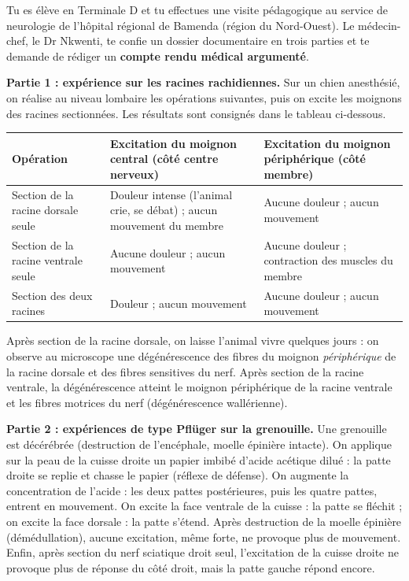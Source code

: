 \documentclass[11pt]{article}
\newcounter{popsec}
\newcounter{popsub}
\newcommand{\courssub}[1]{%
  \stepcounter{popsub}%
  \par\vspace{9pt}\noindent{\popxbold\fontsize{11.5}{13}\selectfont\color{popink}{\color{poporange}\thepopsec.\thepopsub}\hspace{6pt}#1}\par\nopagebreak\vspace{4pt}
}
\begin{document}
\courssub{Situation}

Tu es élève en Terminale D et tu effectues une visite pédagogique au service de neurologie de l'hôpital régional de Bamenda (région du Nord-Ouest). Le médecin-chef, le Dr Nkwenti, te confie un dossier documentaire en trois parties et te demande de rédiger un \textbf{compte rendu médical argumenté}.

\textbf{Partie 1 : expérience sur les racines rachidiennes.} Sur un chien anesthésié, on réalise au niveau lombaire les opérations suivantes, puis on excite les moignons des racines sectionnées. Les résultats sont consignés dans le tableau ci-dessous.

\begin{center}
\begin{tabularx}{\linewidth}{|l|X|X|}
\hline
\rowcolor{popblueL} \textbf{Opération} & \textbf{Excitation du moignon central (côté centre nerveux)} & \textbf{Excitation du moignon périphérique (côté membre)} \\
\hline
Section de la racine dorsale seule & Douleur intense (l'animal crie, se débat) ; aucun mouvement du membre & Aucune douleur ; aucun mouvement \\
\hline
Section de la racine ventrale seule & Aucune douleur ; aucun mouvement & Aucune douleur ; contraction des muscles du membre \\
\hline
Section des deux racines & Douleur ; aucun mouvement & Aucune douleur ; aucun mouvement \\
\hline
\end{tabularx}
\end{center}

Après section de la racine dorsale, on laisse l'animal vivre quelques jours : on observe au microscope une dégénérescence des fibres du moignon \emph{périphérique} de la racine dorsale et des fibres sensitives du nerf. Après section de la racine ventrale, la dégénérescence atteint le moignon périphérique de la racine ventrale et les fibres motrices du nerf (dégénérescence wallérienne).

\textbf{Partie 2 : expériences de type Pflüger sur la grenouille.} Une grenouille est décérébrée (destruction de l'encéphale, moelle épinière intacte). On applique sur la peau de la cuisse droite un papier imbibé d'acide acétique dilué : la patte droite se replie et chasse le papier (réflexe de défense). On augmente la concentration de l'acide : les deux pattes postérieures, puis les quatre pattes, entrent en mouvement. On excite la face ventrale de la cuisse : la patte se fléchit ; on excite la face dorsale : la patte s'étend. Après destruction de la moelle épinière (démédullation), aucune excitation, même forte, ne provoque plus de mouvement. Enfin, après section du nerf sciatique droit seul, l'excitation de la cuisse droite ne provoque plus de réponse du côté droit, mais la patte gauche répond encore.
\end{document}
